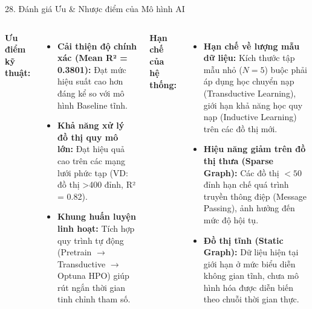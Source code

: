 \begin{frame}{28. Đánh giá Ưu \& Nhược điểm của Mô hình AI}
    \begin{columns}
        \textbf{Ưu điểm kỹ thuật:}
        \begin{itemize}
            \item \textbf{Cải thiện độ chính xác (Mean R² = 0.3801):} Đạt mức hiệu suất cao hơn đáng kể so với mô hình Baseline tĩnh.
            \item \textbf{Khả năng xử lý đồ thị quy mô lớn:} Đạt hiệu quả cao trên các mạng lưới phức tạp (VD: đồ thị >400 đỉnh, R² = 0.82).
            \item \textbf{Khung huấn luyện linh hoạt:} Tích hợp quy trình tự động (Pretrain $\rightarrow$ Transductive $\rightarrow$ Optuna HPO) giúp rút ngắn thời gian tinh chỉnh tham số.
        \end{itemize}
        
        \textbf{Hạn chế của hệ thống:}
        \begin{itemize}
            \item \textbf{Hạn chế về lượng mẫu dữ liệu:} Kích thước tập mẫu nhỏ ($N=5$) buộc phải áp dụng học chuyển nạp (Transductive Learning), giới hạn khả năng học quy nạp (Inductive Learning) trên các đồ thị mới.
            \item \textbf{Hiệu năng giảm trên đồ thị thưa (Sparse Graph):} Các đồ thị $<50$ đỉnh hạn chế quá trình truyền thông điệp (Message Passing), ảnh hưởng đến mức độ hội tụ.
            \item \textbf{Đồ thị tĩnh (Static Graph):} Dữ liệu hiện tại giới hạn ở mức biểu diễn không gian tĩnh, chưa mô hình hóa được diễn biến theo chuỗi thời gian thực.
        \end{itemize}
    \end{columns}
\end{frame}


